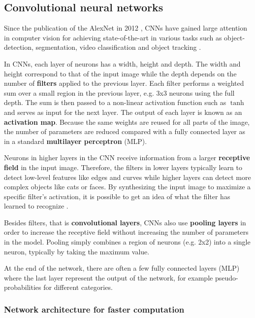 \subsection{Convolutional neural networks}

Since the publication of the AlexNet in 2012 \cite{AlexNet}, CNNs have gained large attention in computer vision for achieving state-of-the-art in various tasks such as object-detection, segmentation, video classification and object tracking \cite{InceptionV3}.


In CNNs, each layer of neurons has a width, height and depth. The width and height correspond to that of the input image while the depth depends on the number of \textbf{filters} applied to the previous layer.
Each filter performs a weighted sum over a small region in the previous layer, e.g. 3x3 neurons using the full depth. The sum is then passed to a non-linear activation function such as $\tanh$ and serves as input for the next layer. The output of each layer is known as an \textbf{activation map}.
Because the same weights are reused for all parts of the image, the number of parameters are reduced compared with a fully connected layer as in a standard \textbf{multilayer perceptron} (MLP).

Neurons in higher layers in the CNN receive information from a larger \textbf{receptive field} in the input image. Therefore, the filters in lower layers typically learn to detect low-level features like edges and curves while higher layers can detect more complex objects like cats or faces.
By synthesizing the input image to maximize a specific filter's activation, it is possible to get an idea of what the filter has learned to recognize \cite{VisualizeCnn}.

Besides filters, that is \textbf{convolutional layers}, CNNs also use \textbf{pooling layers} in order to increase the receptive field without increasing the number of parameters in the model.
Pooling simply combines a region of neurons (e.g. 2x2) into a single neuron, typically by taking the maximum value.

At the end of the network, there are often a few fully connected layers (MLP) where the last layer represent the output of the network, for example pseudo-probabilities for different categories.

\subsubsection{Network architecture for faster computation}

